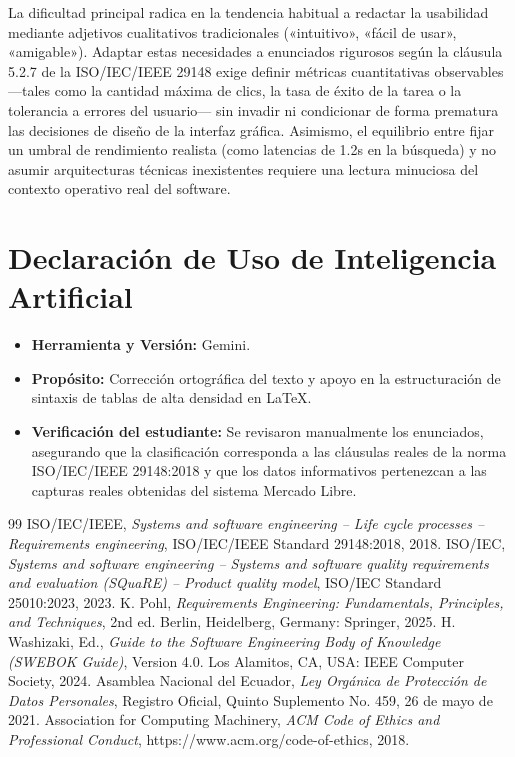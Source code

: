 \documentclass[11pt, a4paper]{article}
\begin{document}
La dificultad principal radica en la tendencia habitual a redactar la usabilidad mediante adjetivos cualitativos tradicionales («intuitivo», «fácil de usar», «amigable»). Adaptar estas necesidades a enunciados rigurosos según la cláusula 5.2.7 de la ISO/IEC/IEEE 29148 exige definir métricas cuantitativas observables ---tales como la cantidad máxima de clics, la tasa de éxito de la tarea o la tolerancia a errores del usuario--- sin invadir ni condicionar de forma prematura las decisiones de diseño de la interfaz gráfica. Asimismo, el equilibrio entre fijar un umbral de rendimiento realista (como latencias de 1.2s en la búsqueda) y no asumir arquitecturas técnicas inexistentes requiere una lectura minuciosa del contexto operativo real del software.

\section{Declaración de Uso de Inteligencia Artificial}
\begin{itemize}
    \item \textbf{Herramienta y Versión:} Gemini.
    \item \textbf{Propósito:} Corrección ortográfica del texto y apoyo en la estructuración de sintaxis de tablas de alta densidad en \LaTeX.
    \item \textbf{Verificación del estudiante:} Se revisaron manualmente los enunciados, asegurando que la clasificación corresponda a las cláusulas reales de la norma ISO/IEC/IEEE 29148:2018 \cite{iso29148} y que los datos informativos pertenezcan a las capturas reales obtenidas del sistema Mercado Libre.
\end{itemize}

\begin{thebibliography}{99}
 ISO/IEC/IEEE, \emph{Systems and software engineering -- Life cycle processes -- Requirements engineering}, ISO/IEC/IEEE Standard 29148:2018, 2018.
 ISO/IEC, \emph{Systems and software engineering -- Systems and software quality requirements and evaluation (SQuaRE) -- Product quality model}, ISO/IEC Standard 25010:2023, 2023.
 K. Pohl, \emph{Requirements Engineering: Fundamentals, Principles, and Techniques}, 2nd ed. Berlin, Heidelberg, Germany: Springer, 2025.
 H. Washizaki, Ed., \emph{Guide to the Software Engineering Body of Knowledge (SWEBOK Guide)}, Version 4.0. Los Alamitos, CA, USA: IEEE Computer Society, 2024.
 Asamblea Nacional del Ecuador, \emph{Ley Orgánica de Protección de Datos Personales}, Registro Oficial, Quinto Suplemento No. 459, 26 de mayo de 2021.
 Association for Computing Machinery, \emph{ACM Code of Ethics and Professional Conduct}, https://www.acm.org/code-of-ethics, 2018.
\end{thebibliography}
\end{document}
